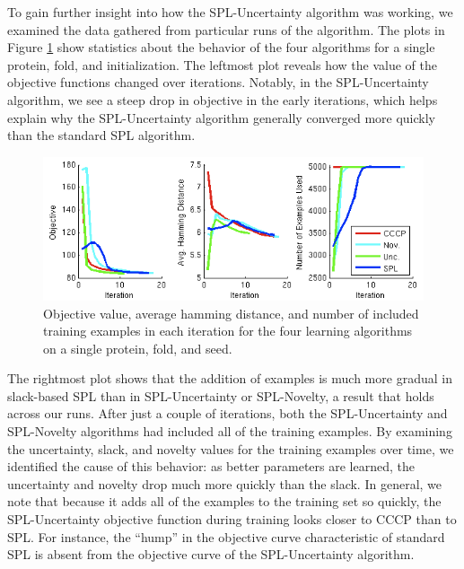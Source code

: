 \documentclass{article}
\begin{document}
To gain further insight into how the SPL-Uncertainty algorithm was working, we examined the data gathered  from particular runs of the algorithm. The plots in Figure \ref{fig:exrun} show statistics about the behavior of the four algorithms for a single protein, fold, and initialization. The leftmost plot reveals how the value of the objective functions changed over iterations. Notably, in the SPL-Uncertainty algorithm, we see a steep drop in objective in the early iterations, which helps explain why the SPL-Uncertainty algorithm generally converged more quickly than the standard SPL algorithm. 

\begin{figure}
\includegraphics[scale = 0.7]{ExampleMotifRun_WithNovelty_small2.png}
\caption{Objective value, average hamming distance, and number of included training examples in each iteration for the four learning algorithms on a single protein, fold, and seed.}
\label{fig:exrun}
\end{figure}

The rightmost plot shows that the addition of examples is much more gradual in slack-based SPL than in SPL-Uncertainty or SPL-Novelty, a result that holds across our runs. After just a couple of iterations, both the SPL-Uncertainty and SPL-Novelty algorithms had included all of the training examples. By examining the uncertainty, slack, and novelty values for the training examples over time, we identified the cause of this behavior: as better parameters are learned, the uncertainty and novelty drop much more quickly than the slack. In general, we note that because it adds all of the examples to the training set so quickly, the SPL-Uncertainty objective function during training looks closer to CCCP than to SPL. For instance, the ``hump'' in the objective curve characteristic of standard SPL is absent from the objective curve of the SPL-Uncertainty algorithm.
\end{document}
